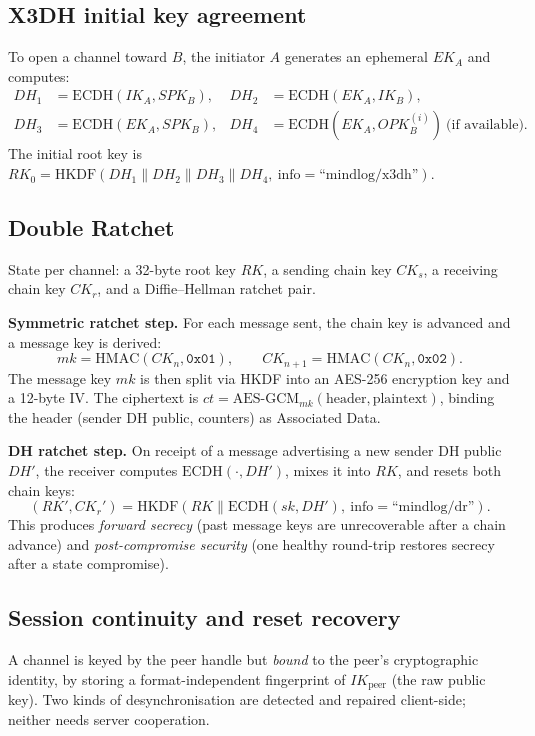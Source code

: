 \documentclass[11pt,a4paper]{article}
\begin{document}
\subsection{X3DH initial key agreement}

To open a channel toward $B$, the initiator $A$ generates an ephemeral
$EK_A$ and computes:
\begin{align*}
DH_1 &= \text{ECDH}(IK_A, SPK_B), &
DH_2 &= \text{ECDH}(EK_A, IK_B), \\
DH_3 &= \text{ECDH}(EK_A, SPK_B), &
DH_4 &= \text{ECDH}(EK_A, OPK_B^{(i)})\ \text{(if available).}
\end{align*}
The initial root key is
$RK_0 = \mathrm{HKDF}(DH_1 \| DH_2 \| DH_3 \| DH_4,\ \text{info}=\text{``mindlog/x3dh''})$.

\subsection{Double Ratchet}

State per channel: a 32-byte root key $RK$, a sending chain key $CK_s$, a
receiving chain key $CK_r$, and a Diffie--Hellman ratchet pair.

\textbf{Symmetric ratchet step.} For each message sent, the chain key is
advanced and a message key is derived:
\[
mk = \mathrm{HMAC}(CK_n, \texttt{0x01}), \qquad
CK_{n+1} = \mathrm{HMAC}(CK_n, \texttt{0x02}).
\]
The message key $mk$ is then split via HKDF into an AES-256 encryption key
and a 12-byte IV. The ciphertext is
$ct = \mathrm{AES\text{-}GCM}_{mk}(\text{header}, \text{plaintext})$,
binding the header (sender DH public, counters) as Associated Data.

\textbf{DH ratchet step.} On receipt of a message advertising a new
sender DH public $DH'$, the receiver computes $\mathrm{ECDH}(\cdot,DH')$,
mixes it into $RK$, and resets both chain keys:
\[
(RK', CK_r') = \mathrm{HKDF}(RK \| \mathrm{ECDH}(sk, DH'),\ \text{info}=\text{``mindlog/dr''}).
\]
This produces \emph{forward secrecy} (past message keys are unrecoverable
after a chain advance) and \emph{post-compromise security} (one healthy
round-trip restores secrecy after a state compromise).

\subsection{Session continuity and reset recovery}

A channel is keyed by the peer handle but \emph{bound} to the peer's
cryptographic identity, by storing a format-independent fingerprint of
$IK_{\text{peer}}$ (the raw public key). Two kinds of desynchronisation are
detected and repaired client-side; neither needs server cooperation.
\end{document}
